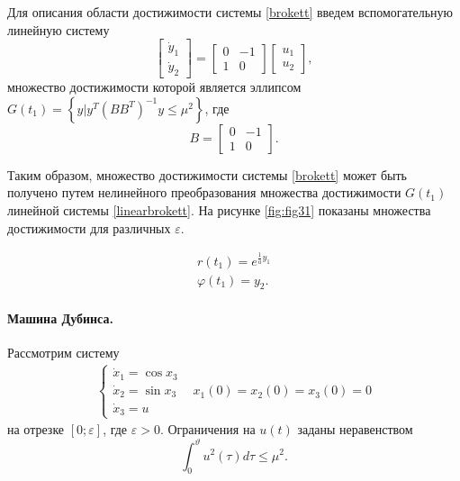 \documentclass[../main.tex]{subfiles}
\begin{document}
 
 
 
 Для описания области достижимости системы \eqref{brokett} введем вспомогательную линейную систему
 \begin{equation}\label{linearbrokett}
	 \left[ {\begin{array}{*{20}{c}}
			 {{{\dot y}_1}}\\
			 {{{\dot y}_2}}
	 \end{array}} \right] = \left[ {\begin{array}{*{20}{c}}
			 0&{ - 1}\\
			 1&0
	 \end{array}} \right]\left[ {\begin{array}{*{20}{c}}
			 {{u_1}}\\
			 {{u_2}}
	 \end{array}} \right],
 \end{equation}
 множество достижимости которой является эллипсом $ G(t_1) = \left\lbrace y | y^T \left( B B^T\right)  ^{-1} y \leq \mu^2 \right\rbrace  $, где 
 \begin{equation*}
	 B = \left[ {\begin{array}{*{20}{c}}
			 0&{ - 1}\\
			 1&0
	 \end{array}} \right].
 \end{equation*}
 
 Таким образом, множество достижимости системы \eqref{brokett} может быть получено путем нелинейного преобразования множества достижимости $ G(t_1) $ линейной системы \eqref{linearbrokett}. На рисунке  \ref{fig:fig31} показаны множества достижимости для различных $ \varepsilon $.
 
 
 \begin{equation*}
	 \begin{array}{l}
		 r({t_1}) = {e^{ \frac{1}{a} y_1}}\\
		 \varphi ({t_1}) =  y_2. 
	 \end{array}
 \end{equation*}
 \paragraph{Машина Дубинса.} 
 Рассмотрим систему 
 \begin{equation}\label{system6}
	 \begin{array}{*{20}{c}}
		 {\left\{ {\begin{array}{*{20}{l}}
					 {{{\dot x}_1} = \cos {x_3}}\\
					 {{{\dot x}_2} = \sin {x_3}}\\
					 {{{\dot x}_3} = u}
			 \end{array}} \right.}&{{x_1}\left( 0 \right) = {x_2}\left( 0 \right) = {x_3}\left( 0 \right) = 0}
	 \end{array}
 \end{equation}
 на отрезке $ \left[0;\varepsilon \right] $, где $ \varepsilon > 0 $. Ограничения на $ u\left(t \right) $ заданы неравенством 
 \begin{equation}\label{constraints*}
	 \int_{0}^{\vartheta} u^2(\tau) d\tau \leqslant \mu^2.
 \end{equation}
 
\end{document}
